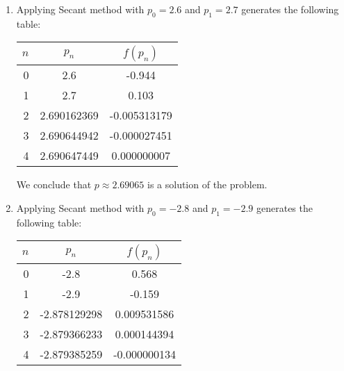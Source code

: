 \documentclass[../../../../Assignments]{subfiles}
\begin{document}
\begin{solution}
    \begin{enumerate}[label= \alph*)]
        \item Applying Secant method with \(p_0 = \num{2.6}\) and \(p_1 =
            \num{2.7}\) generates the following table:

            \begin{table}[H]
                \centering
                \begin{tabular}{r S[table-format=1.9] S[table-format=-1.9]}
                    \toprule
                    \(n\)  &   {\(p_n\)}   &  {\(f(p_n)\)}  \\
                      &  2.6          &  -0.944        \\
                        1  &  2.7          &   0.103        \\
                        2  &  2.690162369  &  -0.005313179  \\
                        3  &  2.690644942  &  -0.000027451  \\
                        4  &  2.690647449  &   0.000000007  \\
                    \bottomrule
                \end{tabular}
            \end{table}

            We conclude that \(p \approx \num{2.69065}\) is a solution of the
            problem.

        \item Applying Secant method with \(p_0 = \num{-2.8}\) and \(p_1 =
            \num{-2.9}\) generates the following table:

            \begin{table}[H]
                \centering
                \begin{tabular}{r S[table-format=-1.9] S[table-format=-1.9]}
                    \toprule
                    \(n\)  &    {\(p_n\)}   &  {\(f(p_n)\)}  \\
                      &  -2.8          &   0.568        \\
                        1  &  -2.9          &  -0.159        \\
                        2  &  -2.878129298  &   0.009531586  \\
                        3  &  -2.879366233  &   0.000144394  \\
                        4  &  -2.879385259  &  -0.000000134  \\
                    \bottomrule
                \end{tabular}
            \end{table}


\end{enumerate}
\end{solution}
\end{document}
